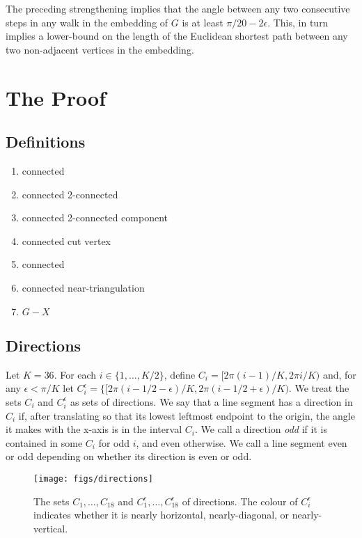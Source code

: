 \documentclass{patmorin}
\begin{document}
The preceding strengthening implies that the angle between any two
consecutive steps in any walk in the embedding of $G$ is at least
$\pi/20-2\epsilon$.  This, in turn implies a lower-bound on the length
of the Euclidean shortest path between any two non-adjacent vertices in
the embedding.

\section{The Proof}

\subsection{Definitions}

\begin{enumerate}
\item connected

\item connected 2-connected

\item connected 2-connected component

\item connected cut vertex

\item connected

\item connected near-triangulation

\item $G-X$
\end{enumerate}

\subsection{Directions}

Let $K=36$.  For each $i\in\{1,\ldots,K/2\}$, define $C_i=[2\pi
(i-1)/K,2\pi i/K)$ and, for any $\epsilon < \pi/K$ let $C_i^\epsilon
= \{[2\pi (i-1/2-\epsilon)/K,2\pi(i-1/2+\epsilon)/K)$.  We treat the
sets $C_i$ and $C_i^\epsilon$ as sets of directions. We say that a line
segment has a direction in $C_i$ if, after translating so that its lowest
leftmost endpoint to the origin, the angle it makes with the x-axis is in
the interval $C_i$.  We call a direction \emph{odd} if it is contained
in some $C_i$ for odd $i$, and even otherwise.  We call a line segment
even or odd depending on whether its direction is even or odd.

\begin{figure}
  \begin{center}
     \texttt{[image: figs/directions]}
  \end{center}
  \caption{The sets $C_1,\ldots,C_{18}$ and $C_1^{\epsilon},\ldots,C_{18}^\epsilon$ of directions.  The colour of $C_i^\epsilon$ indicates whether it is nearly horizontal, nearly-diagonal, or nearly-vertical.}
\end{figure}
\end{document}
